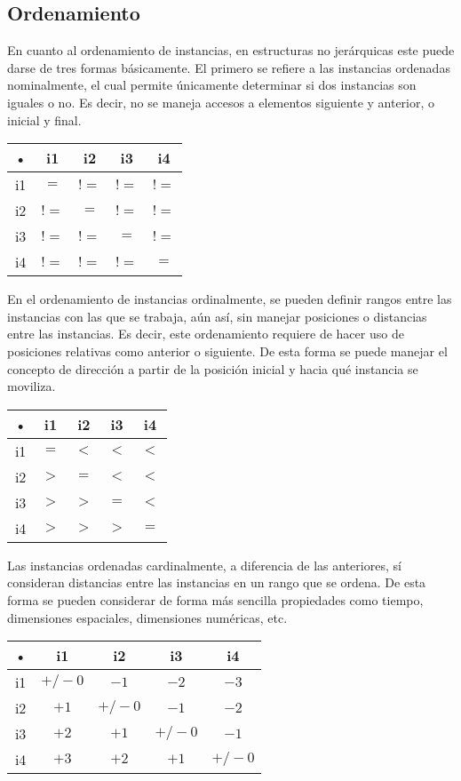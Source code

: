 \documentclass[DIV=calc, paper=a4, fontsize=11pt, twocolumn]{scrartcl}	 %
\begin{document}
\subsection*{Ordenamiento}

En cuanto al ordenamiento de instancias, en estructuras no jer\'{a}rquicas este puede darse de tres formas b\'{a}sicamente. El primero se refiere a las instancias ordenadas nominalmente, el cual permite \'{u}nicamente determinar si dos instancias son iguales o no. Es decir, no se maneja accesos a elementos siguiente y anterior, o inicial y final.
\begin{center}
\begin{tabular}{|c|c|c|c|c|}
\hline 
• & i1 & i2 & i3 & i4 \\ 
\hline 
i1 & $=$ & $!=$ & $!=$ & $!=$ \\ 
\hline 
i2 & $!=$ & $=$ & $!=$ & $!=$ \\ 
\hline 
i3 & $!=$ & $!=$ & $=$ & $!=$ \\ 
\hline 
i4 & $!=$ & $!=$ & $!=$ & $=$ \\ 
\hline 
\end{tabular} 
\end{center}
En el ordenamiento de instancias ordinalmente, se pueden definir rangos entre las instancias con las que se trabaja, a\'{u}n as\'{i}, sin manejar posiciones o distancias entre las instancias. Es decir, este ordenamiento requiere de hacer uso  de posiciones relativas como anterior o siguiente. De esta forma se puede manejar el concepto de direcci\'{o}n a partir de la posici\'{o}n inicial y hacia qu\'{e} instancia se moviliza.
\begin{center}
\begin{tabular}{|c|c|c|c|c|}
\hline 
• & i1 & i2 & i3 & i4 \\ 
\hline 
i1 & $=$ & $<$ & $<$ & $<$ \\ 
\hline 
i2 & $>$ & $=$ & $<$ & $<$ \\ 
\hline 
i3 & $>$ & $>$ & $=$ & $<$ \\ 
\hline 
i4 & $>$ & $>$ & $>$ & $=$ \\ 
\hline 
\end{tabular} 
\end{center}
Las  instancias ordenadas cardinalmente, a diferencia de las anteriores, s\'{i} consideran distancias entre las instancias en un rango que se ordena. De esta forma se pueden considerar de forma m\'{a}s sencilla propiedades como tiempo, dimensiones espaciales, dimensiones num\'{e}ricas, etc.
\begin{center}
\begin{tabular}{|c|c|c|c|c|}
\hline 
• & i1 & i2 & i3 & i4 \\ 
\hline 
i1 & $+/-0$ & $-1$ & $-2$ & $-3$ \\ 
\hline 
i2 & $+1$ & $+/-0$ & $-1$ & $-2$ \\ 
\hline 
i3 & $+2$ & $+1$ & $+/-0$ & $-1$ \\ 
\hline 
i4 & $+3$ & $+2$ & $+1$ & $+/-0$ \\ 
\hline 
\end{tabular} 
\end{center}
\end{document}
